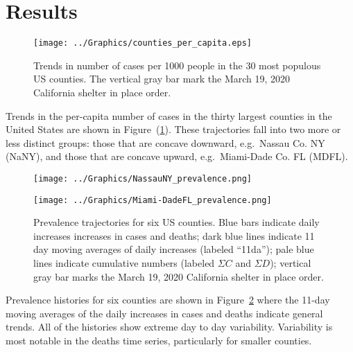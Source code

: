 \documentclass[12pt,letterpaper]{article}
\newcommand\help[1]{\color{Magenta}{\it #1 }\normalcolor}
\newcommand\EG{e.g.\ }
\begin{document}
\section*{Results}

\begin{figure}
\begin{center}
\texttt{[image: ../Graphics/counties\_per\_capita.eps]}
\end{center}
\caption{\label{fig:percap}
Trends in number of cases per 1000 people in the 30 most populous US
counties.
The vertical gray bar mark the March 19, 2020 California shelter in place order.
}
\end{figure}


Trends in the per-capita number of cases in the thirty largest counties in the
United States are shown in Figure~(\ref{fig:percap}).
These trajectories fall into two more or less distinct groups: those
that are concave downward, \EG Nassau Co. NY (NaNY), and those that are
concave upward, \EG Miami-Dade Co. FL (MDFL).


\begin{figure}
{\scriptsize
\begin{center}
\texttt{[image: ../Graphics/NassauNY\_prevalence.png]}
 
\vspace{0.25truein}

\texttt{[image: ../Graphics/Miami-DadeFL\_prevalence.png]}
\end{center}
}
\caption{\label{fig:prev}
Prevalence trajectories for six US counties.
Blue bars indicate daily increases increases in cases and deaths;
dark blue lines indicate 11 day moving averages of daily increases
(labeled ``11da''); 
pale blue lines indicate cumulative numbers (labeled $\Sigma C$ and
$\Sigma D$); 
vertical gray bar marks the March 19, 2020 California shelter in place order.
\help{remove annotations.}
}
\end{figure}

Prevalence histories for six counties are shown in
Figure~\ref{fig:prev} where the 11-day moving averages of the daily
increases in cases and deaths indicate general trends.
All of the histories show extreme day to day variability.
Variability is most notable in the deaths
time series, particularly for smaller counties.
\end{document}

